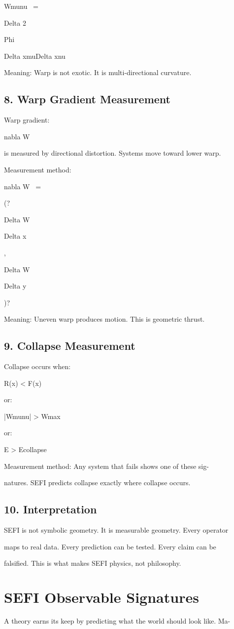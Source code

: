 \documentclass[10pt]{article}
\begin{document}
Wmunu ~=

Delta 2

Phi

Delta xmuDelta xnu

Meaning: Warp is not exotic. It is multi-directional curvature.

\subsection*{8. Warp Gradient Measurement}
Warp gradient:

nabla W

is measured by directional distortion. Systems move toward lower warp.

Measurement method:

nabla W ~=

(?

Delta W

Delta x

,

Delta W

Delta y

)?

Meaning: Uneven warp produces motion. This is geometric thrust.

\subsection*{9. Collapse Measurement}
Collapse occurs when:

R(x) < F(x)

or:

|Wmunu| > Wmax

or:

E > Ecollapse

Measurement method: Any system that fails shows one of these sig-

natures. SEFI predicts collapse exactly where collapse occurs.


\subsection*{10. Interpretation}
SEFI is not symbolic geometry. It is measurable geometry. Every operator

maps to real data. Every prediction can be tested. Every claim can be

falsified. This is what makes SEFI physics, not philosophy.

\section*{SEFI Observable Signatures}
A theory earns its keep by predicting what the world should look like. Ma-
\end{document}
